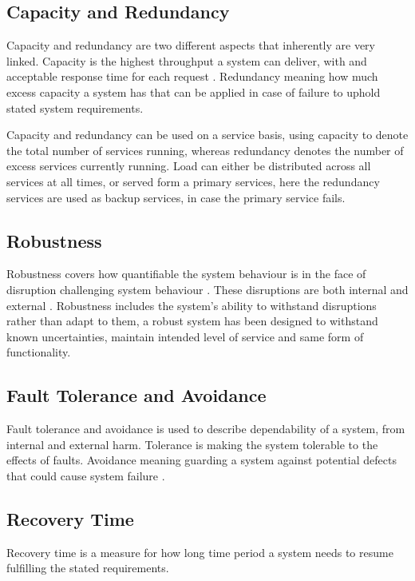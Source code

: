 \subsection{Capacity and Redundancy}
Capacity and redundancy are two different aspects that inherently are very linked. Capacity is the highest throughput a system can deliver, with and acceptable response time for each request \cite[p. 136]{nygard2007release}. Redundancy meaning how much excess capacity a system has that can be applied in case of failure to uphold stated system requirements.

Capacity and redundancy can be used on a service basis, using capacity to denote the total number of services running, whereas redundancy denotes the number of excess services currently running. Load can either be distributed across all services at all times, or served form a primary services, here the redundancy services are used as backup services, in case the primary service fails.

\subsection{Robustness} 
Robustness covers how quantifiable the system behaviour is in the face of disruption challenging system behaviour \cite[p. 10]{sterbenz2010resilience}. These disruptions are both internal and external \cite{omer2013resilience}. Robustness includes the system's ability to withstand disruptions rather than adapt to them, a robust system has been designed to withstand known uncertainties, maintain intended level of service and same form of functionality.

\subsection{Fault Tolerance and Avoidance}
Fault tolerance and avoidance is used to describe dependability of a system, from internal and external harm. Tolerance is making the system tolerable to the effects of faults. Avoidance meaning guarding a system against potential defects that could cause system failure \cite{strigini2012fault}.


\subsection{Recovery Time} 
Recovery time is a measure for how long time period a system needs to resume fulfilling the stated requirements.

